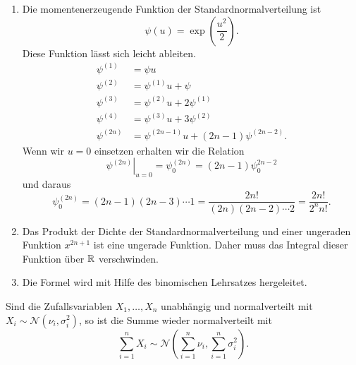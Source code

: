 \solution
\begin{enumerate}
    \item 
        Die momentenerzeugende Funktion der Standardnormalverteilung ist 
        \begin{equation*}
            \psi(u) = \exp \left( \frac{u^2}{2} \right).
        \end{equation*}
        Diese Funktion lässt sich leicht ableiten. 
        \begin{align*}
            \psi^{(1)} &= \psi u \\
            \psi^{(2)} &= \psi^{(1)} u + \psi \\
            \psi^{(3)} &= \psi^{(2)} u + 2 \psi^{(1)} \\
            \psi^{(4)} &= \psi^{(3)} u + 3 \psi^{(2)} \\
            \psi^{(2n)} &= \psi^{(2n-1)} u + (2n-1) \psi^{(2n-2)}.
        \end{align*}
        Wenn wir $u=0$ einsetzen erhalten wir die Relation
        \begin{equation*}
            \left. \psi^{(2n)} \right|_{u=0}^{} =
            \psi_{0}^{(2n)} = (2n-1)\psi^{2n-2}_{0}
        \end{equation*}
        und daraus
        \begin{equation*}
            \psi_{0}^{(2n)} = (2n-1)(2n-3) \cdots 1 = \frac{ 2n!}{ (2n)(2n-2)\cdots 2  } = \frac{2n!}{ 2^n n!}.
        \end{equation*}
    \item Das Produkt der Dichte der Standardnormalverteilung und einer ungeraden Funktion 
        $x^{2n+1}$ ist eine ungerade Funktion. Daher muss das Integral dieser Funktion über $\mathbb R$
        verschwinden. 
    \item Die Formel wird mit Hilfe des binomischen Lehrsatzes hergeleitet. 
\end{enumerate}


Sind die Zufallsvariablen $X_1,\ldots,X_n$ unabhängig und normalverteilt
mit $X_i \sim \mathcal N (\nu_i, \sigma_i^2)$, so ist die Summe
wieder normalverteilt mit 
\begin{equation*}
    \sum_{i=1}^{n} X_i \sim 
    \mathcal N \left( \sum_{i=1}^{n} \nu_i, \sum_{i=1}^{n} \sigma_i^2 \right). 
\end{equation*} %

